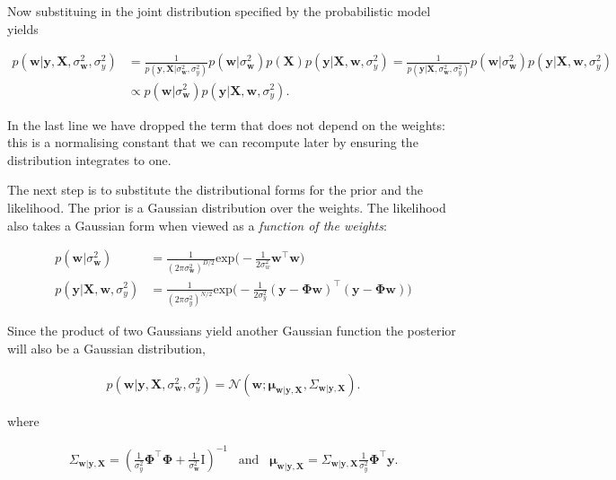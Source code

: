 \documentclass[11pt]{article}
\begin{document}
Now substituing in the joint distribution specified by the probabilistic
model yields

\begin{align}
p(\mathbf{w}|\mathbf{y}, \mathbf{X}, \sigma_{\mathbf{w}}^2, \sigma_{y}^2) & =
 \frac{1}{
 p(\mathbf{y}, \mathbf{X}| \sigma_{\mathbf{w}}^2, \sigma_{y}^2)
 } 
  p(\mathbf{w}| \sigma_{\mathbf{w}}^2) p(\mathbf{X}) p(\mathbf{y}|\mathbf{X}, \mathbf{w}, \sigma_y^2) 
  = 
  \frac{1}{
 p(\mathbf{y} | \mathbf{X}, \sigma_{\mathbf{w}}^2, \sigma_{y}^2)
 } 
  p(\mathbf{w}| \sigma_{\mathbf{w}}^2)  p(\mathbf{y}|\mathbf{X}, \mathbf{w}, \sigma_y^2) \\ 
  & \propto p(\mathbf{w}| \sigma_{\mathbf{w}}^2)  p(\mathbf{y}|\mathbf{X}, \mathbf{w}, \sigma_y^2).
\end{align}

In the last line we have dropped the term that does not depend on the
weights: this is a normalising constant that we can recompute later by
ensuring the distribution integrates to one.

The next step is to substitute the distributional forms for the prior
and the likelihood. The prior is a Gaussian distribution over the
weights. The likelihood also takes a Gaussian form when viewed as a
\emph{function of the weights}:

\[\begin{align}
p(\mathbf{w}| \sigma_{\mathbf{w}}^2) &= \frac{1}{(2\pi \sigma_{\mathbf{w}}^2)^{D/2}}\text{exp}\big(-\frac{1}{2\sigma_w^2}\mathbf{w}^\top \mathbf{w}\big)\\
p(\mathbf{y}|\mathbf{X}, \mathbf{w}, \sigma_y^2) &= \frac{1}{(2\pi \sigma_y^2)^{N/2}}\text{exp}\big(-\frac{1}{2\sigma_y^2}(\mathbf{y} - \boldsymbol{\Phi}\mathbf{w})^\top (\mathbf{y} - \boldsymbol{\Phi}\mathbf{w})\big)
\end{align}\]

Since the product of two Gaussians yield another Gaussian function the
posterior will also be a Gaussian distribution,

\begin{align}
p(\mathbf{w}|\mathbf{y}, \mathbf{X}, \sigma_{\mathbf{w}}^2, \sigma_{y}^2) = \mathcal{N}(\mathbf{w}; \mathbf{\mu}_{\mathbf{w} | \mathbf{y}, \mathbf{X} },\Sigma_{\mathbf{w} | \mathbf{y}, \mathbf{X} }).
\end{align}

where

\begin{align}
\Sigma_{\mathbf{w} | \mathbf{y}, \mathbf{X} }  = \left( \frac{1}{\sigma_y^2} \boldsymbol{\Phi}^\top \boldsymbol{\Phi} + \frac{1}{\sigma_{\mathbf{w}}^2} \mathrm{I} \right)^{-1} \;\;\; \text{and} \;\;\;
\mathbf{\mu}_{\mathbf{w} | \mathbf{y}, \mathbf{X} } =  \Sigma_{\mathbf{w} | \mathbf{y}, \mathbf{X} } \frac{1}{\sigma_y^2}  \boldsymbol{\Phi}^\top \mathbf{y}.
\end{align}
\end{document}
